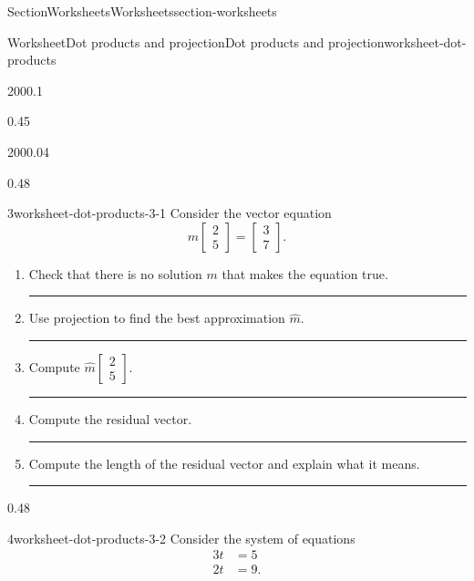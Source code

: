 \documentclass[twoside,10pt,]{article}
\newlength{\workspacestrutwidth}
\numberwithin{equation}{section}
\newcommand{\amp}{&}
\begin{document}
\begin{sectionptx}{Section}{Worksheets}{}{Worksheets}{}{}{section-worksheets}
\begin{worksheet-subsection}{Worksheet}{Dot products and projection}{}{Dot products and projection}{}{}{worksheet-dot-products}
\begin{sidebyside}{2}{0}{0}{0.1}
\begin{sbspanel}{0.45}
\end{sbspanel}%
\end{sidebyside}%
\begin{sidebyside}{2}{0}{0}{0.04}%
\begin{sbspanel}{0.48}%
\begin{divisionexercise}{3}{}{}{worksheet-dot-products-3-1}%
Consider the vector equation%
\begin{equation*}
m \begin{bmatrix}2 \\ 5\end{bmatrix} = \begin{bmatrix}3 \\ 7\end{bmatrix}\text{.}
\end{equation*}
%
\begin{enumerate}[font=\bfseries,label=(\alph*),ref=\alph*]%
\item{}Check that there is no solution \(m\) that makes the equation true.%
\par\rule{\workspacestrutwidth}{1.25in}%
\item{}Use projection to find the best approximation \(\hat m\).%
\par\rule{\workspacestrutwidth}{1.25in}%
\item{}Compute \(\hat m \begin{bmatrix}2 \\ 5\end{bmatrix} \).%
\par\rule{\workspacestrutwidth}{1.25in}%
\item{}Compute the residual vector.%
\par\rule{\workspacestrutwidth}{1.25in}%
\item{}Compute the length of the residual vector and explain what it means.%
\par\rule{\workspacestrutwidth}{1.25in}%
\end{enumerate}%
\end{divisionexercise}%
\end{sbspanel}%
\begin{sbspanel}{0.48}%
\begin{divisionexercise}{4}{}{}{worksheet-dot-products-3-2}%
Consider the system of equations%
\begin{align*}
3t \amp =5\\
2t \amp = 9 \text{.}
\end{align*}
%
\begin{enumerate}[font=\bfseries,label=(\alph*),ref=\alph*]%

\end{enumerate}
\end{divisionexercise}
\end{sbspanel}
\end{sidebyside}
\end{worksheet-subsection}
\end{sectionptx}
\end{document}
